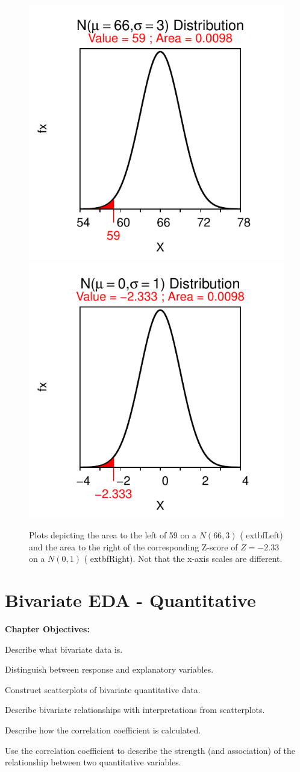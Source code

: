 \documentclass[10pt,openany]{book}\usepackage[]{graphicx}\usepackage[]{color}
\newenvironment{knitrout}{}{} %
\begin{document}
\begin{knitrout}
\color{fgcolor}\begin{figure}[hbtp]

{\centering \includegraphics[width=.4\linewidth]{Figs/NormStandardizingEx-1} 
\includegraphics[width=.4\linewidth]{Figs/NormStandardizingEx-2} 

}

\caption{Plots depicting the area to the left of 59 on a $N(66,3)$ (	extbf{Left}) and the area to the right of the corresponding Z-score of $Z=-2.33$ on a $N(0,1)$ (	extbf{Right}).  Not that the x-axis scales are different.}\label{fig:NormStandardizingEx}
\end{figure}


\end{knitrout}



\chapter{Bivariate EDA - Quantitative} \label{chap:BivEDAQuant}
\begin{ChapObj}{\boxwidth}
  \textbf{Chapter Objectives:}
  \begin{Enumerate}
    \item Describe what bivariate data is.
    \item Distinguish between response and explanatory variables.
    \item Construct scatterplots of bivariate quantitative data.
    \item Describe bivariate relationships with interpretations from scatterplots.
    \item Describe how the correlation coefficient is calculated.
    \item Use the correlation coefficient to describe the strength (and association) of the relationship between two quantitative variables.
  \end{Enumerate}
\end{ChapObj}
\end{document}
